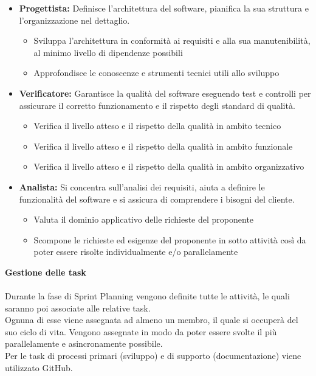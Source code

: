 \begin{itemize}
\begin{itemize}
  \end{itemize}
  \item \textbf{Progettista:} Definisce l'architettura del software, pianifica la sua struttura e l'organizzazione nel dettaglio.
	\begin{itemize}
    \item{Sviluppa l'architettura in conformità ai requisiti e alla sua manutenibilità, al minimo livello di dipendenze possibili}
    \item{Approfondisce le conoscenze e strumenti tecnici utili allo sviluppo}
  \end{itemize}
  \item \textbf{Verificatore:} Garantisce la qualità del software eseguendo test e controlli per assicurare il corretto funzionamento e il rispetto degli standard di qualità.
	\begin{itemize}
    \item{Verifica il livello atteso e il rispetto della qualità in ambito tecnico}
    \item{Verifica il livello atteso e il rispetto della qualità in ambito funzionale}
    \item{Verifica il livello atteso e il rispetto della qualità in ambito organizzativo}
  \end{itemize}
  \item \textbf{Analista:} Si concentra sull'analisi dei requisiti, aiuta a definire le funzionalità del software e si assicura di comprendere i bisogni del cliente.
  \begin{itemize}
    \item{Valuta il dominio applicativo delle richieste del proponente}
    \item{Scompone le richieste ed esigenze del proponente in sotto attività così da poter essere risolte individualmente e/o parallelamente}
  \end{itemize}
\end{itemize}
\textbf{Gestione delle task}
\\\\
Durante la fase di Sprint Planning vengono definite tutte le attività, le quali saranno poi associate alle relative task.\\
Ognuna di esse viene assegnata ad almeno un membro, il quale si occuperà del suo ciclo di vita. Vengono assegnate in modo da poter essere svolte il più parallelamente e asincronamente possibile.\\
Per le task di processi primari (sviluppo) e di supporto (documentazione) viene utilizzato GitHub.
